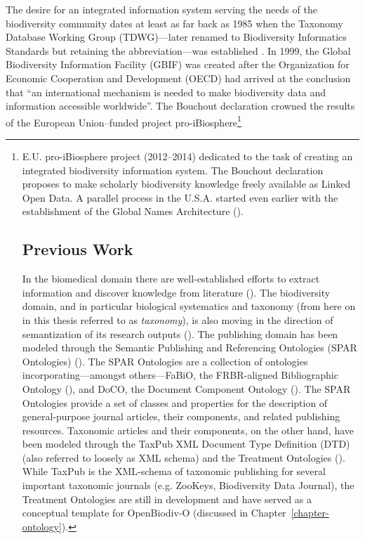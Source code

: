 The desire for an integrated information system serving the needs of the biodiversity community dates at least as far back as 1985 when the Taxonomy Database Working Group (TDWG)---later renamed to Biodiversity Informatics Standards but retaining the abbreviation---was established \cite{noauthor_tdwg_nodate}.  In 1999, the Global Biodiversity Information Facility (GBIF) was created \cite{noauthor_what_nodate} after the Organization for Economic Cooperation and Development (OECD) had arrived at the conclusion that ``an international mechanism is needed to make biodiversity data and information accessible worldwide''.  The Bouchout declaration \cite{noauthor_bouchout_nodate} crowned the results of the European Union--funded project pro-iBiosphere\footnote{E.U. pro-iBiosphere project \cite{noauthor_pro-ibiosphere_nodate} (2012--2014) dedicated to the task of creating an integrated biodiversity information system.  The Bouchout declaration proposes to make scholarly biodiversity knowledge freely available as Linked Open Data. A parallel process in the U.S.A. started even earlier with the establishment of the Global Names Architecture (\cite{patterson_names_2010,pyle_towards_2016}).

\section{Previous Work}

In the biomedical domain there are well-established efforts to extract information and discover knowledge from literature (\cite{momtchev_expanding_2009, williams_open_2012, rebholz-schuhmann_facts_2005}). The biodiversity domain, and in particular biological systematics and taxonomy (from here on in this thesis referred to as \emph{taxonomy}), is also moving in the direction of semantization of its research outputs (\cite{kennedy_scientific_2005,penev_fast_2010, tzitzikas_integrating_2013}). The publishing domain has been modeled through the Semantic Publishing and Referencing Ontologies (SPAR Ontologies) (\cite{peroni_semantic_2014}). The SPAR Ontologies are a collection of ontologies incorporating---amongst others---FaBiO, the FRBR-aligned Bibliographic Ontology (\cite{peroni_fabio_2012}), and DoCO, the Document Component Ontology (\cite{constantin_document_2016}). The SPAR Ontologies provide a set of classes and properties for the description of general-purpose journal articles, their components, and related publishing resources. Taxonomic articles and their components, on the other hand, have been modeled through the TaxPub XML Document Type Definition (DTD) (also referred to loosely as XML schema) and the Treatment Ontologies (\cite{catapano_taxpub:_2010}). While TaxPub is the XML-schema of taxonomic publishing for several important taxonomic journals (e.g. ZooKeys, Biodiversity Data Journal), the Treatment Ontologies are still in development and have served as a conceptual template for OpenBiodiv-O (discussed in Chapter~\ref{chapter-ontology}). 

}
